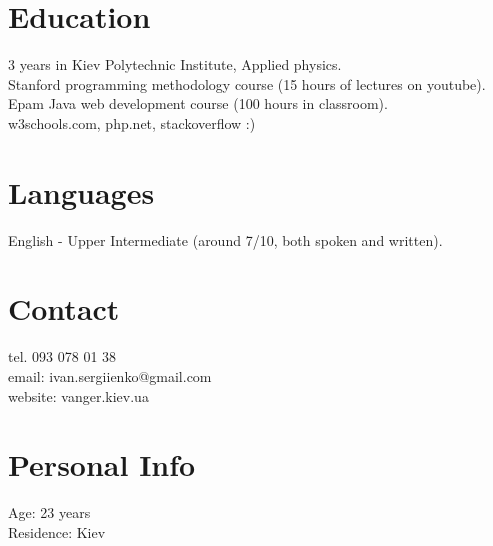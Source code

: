 \documentclass[a4paper, 14pt]{article}
\begin{document}
\section{Education}
	3 years in Kiev Polytechnic Institute, Applied physics. \\
	Stanford programming methodology course (15 hours of lectures on youtube). \\
	Epam Java web development course (100 hours in classroom). \\
	w3schools.com, php.net, stackoverflow :)
\section{Languages}
	English - Upper Intermediate (around 7/10, both spoken and written).
\section{Contact}
	tel. 093 078 01 38 \\
	email: ivan.sergiienko@gmail.com \\
	website: vanger.kiev.ua
\section{Personal Info}
	Age: 23 years \\
	Residence: Kiev
\end{document}
